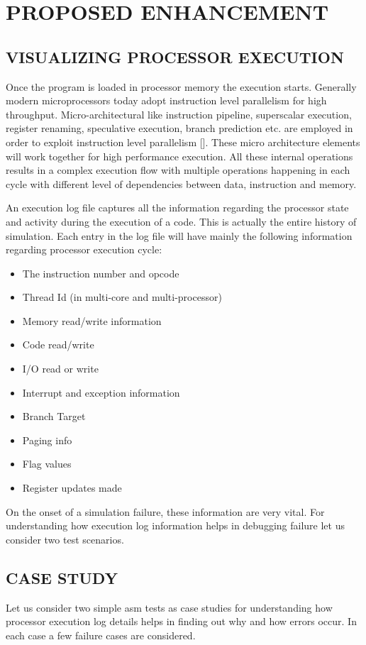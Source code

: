 \chapter{PROPOSED ENHANCEMENT}
\label{chap:enhancement.tex}

\section {VISUALIZING PROCESSOR EXECUTION}

Once the program is loaded in processor memory the execution starts. Generally modern microprocessors today adopt instruction level parallelism for high throughput. Micro-architectural like instruction pipeline, superscalar execution, register renaming, speculative execution, branch prediction etc. are employed in order to exploit instruction level parallelism [].  These micro architecture elements will work together for high performance execution. All these internal operations results in a complex execution flow with multiple operations happening in each cycle with different level of dependencies between data, instruction and memory.


An execution log file captures all the information regarding the processor state and activity during the execution of a code. This is actually the entire history of simulation. Each entry in the log file will have mainly the following information regarding processor execution cycle:
\begin{itemize}
	\item The instruction number and opcode
	\item Thread Id (in multi-core and multi-processor)
	\item Memory read/write information
	\item Code read/write
	\item I/O read or write
	\item Interrupt and exception information
	\item Branch Target
	\item Paging info
	\item Flag values
	\item Register updates made
\end{itemize}
On the onset of a simulation failure, these information are very vital. For understanding how execution log information helps in debugging failure let us consider two test scenarios.

\section {CASE STUDY}
Let us consider two simple asm tests as case studies for understanding how processor execution log details helps in finding out why and how errors occur. In each case a few failure cases are considered. 
